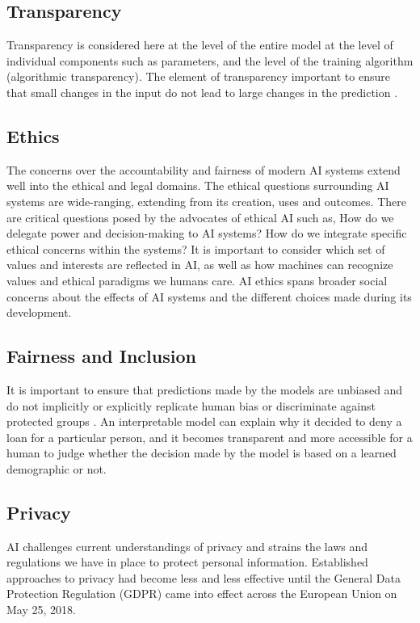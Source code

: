 \subsection{Transparency}

Transparency is considered here at the level of the entire model at the level of individual components such as parameters, and the level of the training algorithm (algorithmic transparency). The element of transparency important to ensure that small changes in the input do not lead to large changes in the prediction \cite{molnar}.

\subsection{Ethics}

The concerns over the accountability and fairness of modern AI systems extend well into the ethical and legal domains. The ethical questions surrounding AI systems are wide-ranging, extending from its creation, uses and outcomes. There are critical questions posed by the advocates of ethical AI such as, How do we delegate power and decision-making to AI systems? \cite{ainow2016report} How do we integrate specific ethical concerns within the systems? It is important to consider which set of values and interests are reflected in AI, as well as how machines can recognize values and ethical paradigms we humans care. AI ethics spans broader social concerns about the effects of AI systems and the different choices made during its development.

\subsection{Fairness and Inclusion}

It is important to ensure that predictions made by the models are unbiased and do not implicitly or explicitly replicate human bias or discriminate against protected groups \cite{ainow2016report}. An interpretable model can explain why it decided to deny a loan for a particular person, and it becomes transparent and more accessible for a human to judge whether the decision made by the model is based on a learned demographic or not.

\subsection{Privacy}

AI challenges current understandings of privacy and strains the laws and regulations we have in place to protect personal information. Established approaches to privacy had become less and less effective until the General Data Protection Regulation (GDPR) came into effect across the European Union on May 25, 2018.

